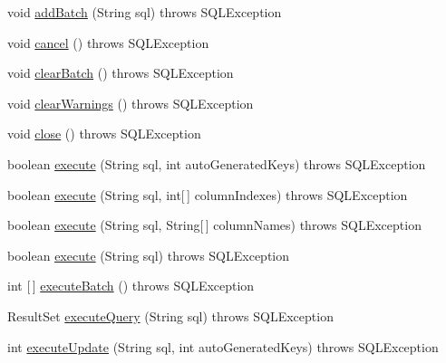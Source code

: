 \begin{DoxyCompactItemize}
void \mbox{\hyperlink{classcom_1_1mysql_1_1cj_1_1jdbc_1_1_statement_wrapper_abcb3d99cfb284a362e721f6712c9ff9d}{add\+Batch}} (String sql)  throws S\+Q\+L\+Exception 
\item 
void \mbox{\hyperlink{classcom_1_1mysql_1_1cj_1_1jdbc_1_1_statement_wrapper_a98d4c8170ee81e046b7c9f54d4fcd7e7}{cancel}} ()  throws S\+Q\+L\+Exception 
\item 
void \mbox{\hyperlink{classcom_1_1mysql_1_1cj_1_1jdbc_1_1_statement_wrapper_a8428143929073c2c72b0ffbe9784bd0e}{clear\+Batch}} ()  throws S\+Q\+L\+Exception 
\item 
void \mbox{\hyperlink{classcom_1_1mysql_1_1cj_1_1jdbc_1_1_statement_wrapper_aa36ea53280b313a3eb6df0898c20d0ac}{clear\+Warnings}} ()  throws S\+Q\+L\+Exception 
\item 
void \mbox{\hyperlink{classcom_1_1mysql_1_1cj_1_1jdbc_1_1_statement_wrapper_a8f729de503d337665eeb6cb4742cefce}{close}} ()  throws S\+Q\+L\+Exception 
\item 
boolean \mbox{\hyperlink{classcom_1_1mysql_1_1cj_1_1jdbc_1_1_statement_wrapper_ac20fb16102963956c27b15914502f18c}{execute}} (String sql, int auto\+Generated\+Keys)  throws S\+Q\+L\+Exception 
\item 
boolean \mbox{\hyperlink{classcom_1_1mysql_1_1cj_1_1jdbc_1_1_statement_wrapper_a67b9fcac19a8d585e4ce453d6779b4d3}{execute}} (String sql, int\mbox{[}$\,$\mbox{]} column\+Indexes)  throws S\+Q\+L\+Exception 
\item 
boolean \mbox{\hyperlink{classcom_1_1mysql_1_1cj_1_1jdbc_1_1_statement_wrapper_aecf4f9fbcc925437764b06aee33c1c24}{execute}} (String sql, String\mbox{[}$\,$\mbox{]} column\+Names)  throws S\+Q\+L\+Exception 
\item 
boolean \mbox{\hyperlink{classcom_1_1mysql_1_1cj_1_1jdbc_1_1_statement_wrapper_aaf78b4bbaca9ce81fc559774db18497e}{execute}} (String sql)  throws S\+Q\+L\+Exception 
\item 
int \mbox{[}$\,$\mbox{]} \mbox{\hyperlink{classcom_1_1mysql_1_1cj_1_1jdbc_1_1_statement_wrapper_ad79219376f282ae7f12987454e338366}{execute\+Batch}} ()  throws S\+Q\+L\+Exception 
\item 
Result\+Set \mbox{\hyperlink{classcom_1_1mysql_1_1cj_1_1jdbc_1_1_statement_wrapper_af554f27181060b4523172617f7101584}{execute\+Query}} (String sql)  throws S\+Q\+L\+Exception 
\item 
int \mbox{\hyperlink{classcom_1_1mysql_1_1cj_1_1jdbc_1_1_statement_wrapper_aa1d6ae38bd7f57560c93b45fed82f713}{execute\+Update}} (String sql, int auto\+Generated\+Keys)  throws S\+Q\+L\+Exception 

\end{DoxyCompactItemize}
